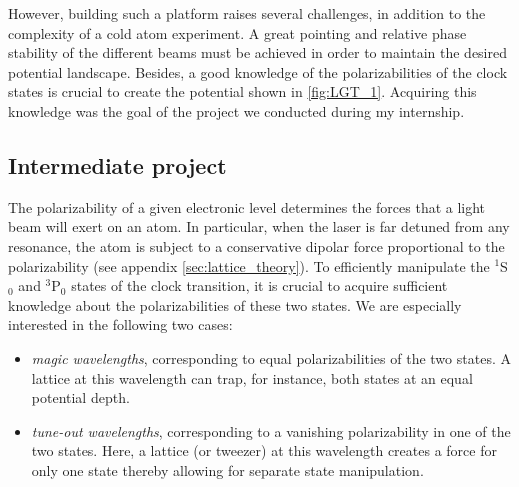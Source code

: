 \documentclass[11pt]{article}
\numberwithin{equation}{section}
\numberwithin{figure}{section}
\begin{document}
However, building such a platform raises several challenges, in addition to the complexity of a  cold atom experiment. A great pointing and relative phase stability of the different beams must be achieved in order to maintain the desired potential landscape. Besides, a good knowledge of the polarizabilities of the clock states is crucial to create the potential shown in \ref{fig:LGT_1}. Acquiring this knowledge was the goal of the project we conducted during my internship. 

\subsection{Intermediate project}
\label{sec:internship_project}

The polarizability of a given electronic level determines the forces that a light beam will exert on an atom. In particular, when the laser is far detuned from any resonance, the atom is subject to a conservative dipolar force proportional to the polarizability (see appendix \ref{sec:lattice_theory}). To efficiently manipulate the  $^1$S$_0$ and $^3$P$_0$ states of the clock transition, it is crucial to acquire sufficient knowledge about the polarizabilities of these two states. We are especially interested in the following two cases:
%
\begin{itemize}
	\item \emph{magic wavelengths}, corresponding to equal polarizabilities of the two states. A lattice at this wavelength can trap, for instance, both states at an equal potential depth.
	\item \emph{tune-out wavelengths}, corresponding to a vanishing polarizability in one of the two states. Here, a lattice (or tweezer) at this wavelength creates a force for only one state thereby allowing for separate state manipulation.
\end{itemize}
%
\end{document}

